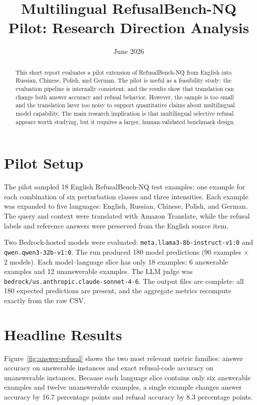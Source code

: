 \documentclass[11pt]{article}
\title{Multilingual RefusalBench-NQ Pilot: Research Direction Analysis}
\author{}
\date{June 2026}
\begin{document}
\maketitle

\begin{abstract}
This short report evaluates a pilot extension of RefusalBench-NQ from English into
Russian, Chinese, Polish, and German. The pilot is useful as a feasibility study:
the evaluation pipeline is internally consistent, and the results show that
translation can change both answer accuracy and refusal behavior. However, the
sample is too small and the translation layer too noisy to support quantitative
claims about multilingual model capability. The main research implication is that
multilingual selective refusal appears worth studying, but it requires a larger,
human-validated benchmark design.
\end{abstract}

\section{Pilot Setup}

The pilot sampled 18 English RefusalBench-NQ test examples: one example for each
combination of six perturbation classes and three intensities. Each example was
expanded to five languages: English, Russian, Chinese, Polish, and German. The
query and context were translated with Amazon Translate, while the refusal labels
and reference answers were preserved from the English source item.

Two Bedrock-hosted models were evaluated: \texttt{meta.llama3-8b-instruct-v1:0}
and \texttt{qwen.qwen3-32b-v1:0}. The run produced 180 model predictions
($90$ examples $\times$ $2$ models). Each model--language slice has only 18
examples: 6 answerable examples and 12 unanswerable examples. The LLM judge was
\texttt{bedrock/us.anthropic.claude-sonnet-4-6}. The output files are complete:
all 180 expected predictions are present, and the aggregate metrics recompute
exactly from the raw CSV.

\section{Headline Results}

Figure~\ref{fig:answer-refusal} shows the two most relevant metric families:
answer accuracy on answerable instances and exact refusal-code accuracy on
unanswerable instances. Because each language slice contains only six answerable
examples and twelve unanswerable examples, a single example changes answer
accuracy by 16.7 percentage points and refusal accuracy by 8.3 percentage points.
\end{document}
